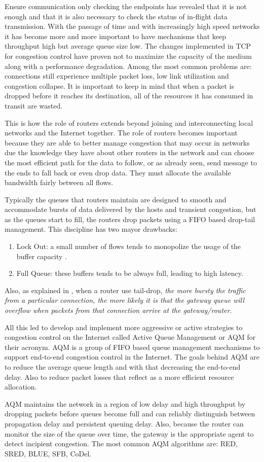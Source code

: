 Ensure communication only checking the endpoints has revealed that it is not
enough and that it is also necessary to check the status of in-flight data
transmission. With the passage of time and with increasingly high speed
networks it has become more and more important to have mechanisms that keep
throughput high but average queue size low. The changes implemented in TCP for
congestion control have proven not to maximize the capacity of the medium
along with a performance degradation. Among the most common problems are:
connections still experience multiple packet loss, low link utilization and
congestion collapse. It is important to keep in mind that when a packet is
dropped before it reaches its destination, all of the resources it has
consumed in transit are wasted.

This is how the role of routers extends beyond joining and interconnecting local
networks and the Internet together. The role of routers becomes important
because they are able to better manage congestion that may occur in networks
due the knowledge they have about other routers in the network and can choose
the most efficient path for the data to follow, or as already seen, send
message to the ends to fall back or even drop data.  They must allocate
the available bandwidth fairly between all flows.

Typically the queues that routers maintain are designed to smooth and
accommodate bursts of data delivered by the hosts and transient congestion,
but as the queues start to fill, the routers drop packets using a FIFO based
drop-tail management. This discipline has two mayor drawbacks:
\begin{enumerate}
\item Lock Out: a small number of flows tends to monopolize the usage of the
buffer capacity\cite{evolvshortlongflows} .
\item Full Queue: these buffers tends to be always full, leading to 
high latency.
\end{enumerate}

Also, as explained in \cite{FloydJacobsonRED}, when a router use tail-drop,
\emph{the more bursty the traffic from a particular connection, the more
likely it is that the gateway queue will overflow when packets from that
connection arrive at the gateway/router}.

All this led to develop and implement more aggressive or active strategies to
congestion control on the Internet called Active Queue Management or AQM for
their acronym. AQM is a group of FIFO based queue management mechanisms to
support end-to-end congestion control in the Internet. The goals behind AQM
are to reduce the average queue length and with that decreasing the end-to-end
delay. Also to reduce packet losses that reflect as a more efficient resource
allocation.

AQM maintains the network in a region of low delay and high throughput by
dropping packets before queues become full and can reliably distinguish
between propagation delay and persistent queuing delay. Also, because the
router can monitor the size of the queue over time, the gateway is the
appropriate agent to detect incipient congestion. The most common AQM
algorithms are: RED, SRED, BLUE, SFB, CoDel.
